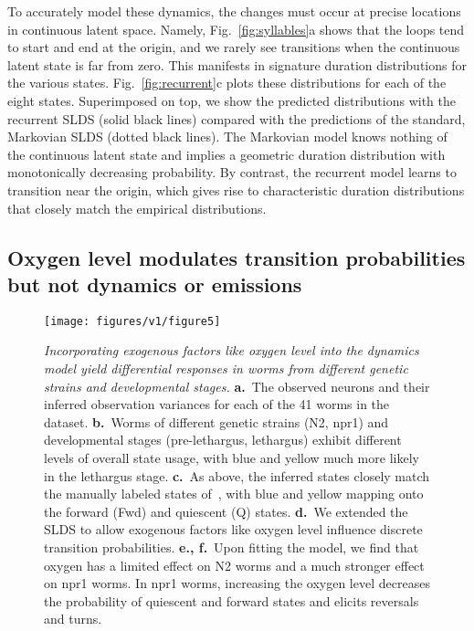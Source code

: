 \documentclass[11pt]{article}
\begin{document}
To accurately model these dynamics, the changes must occur at precise
locations in continuous latent space.  Namely,
Fig.~\ref{fig:syllables}a shows that the loops tend to start and end
at the origin, and we rarely see transitions when the continuous
latent state is far from zero. This manifests in signature duration
distributions for the various states.  Fig.~\ref{fig:recurrent}c plots
these distributions for each of the eight states.  Superimposed on
top, we show the predicted distributions with the recurrent SLDS
(solid black lines) compared with the predictions of the standard,
Markovian SLDS (dotted black lines). The Markovian model knows nothing
of the continuous latent state and implies a geometric duration
distribution with monotonically decreasing probability. By contrast,
the recurrent model learns to transition near the origin, which
gives rise to characteristic duration distributions that closely
match the empirical distributions. 


\subsection*{Oxygen level modulates transition probabilities but not dynamics or emissions}

\begin{figure}[t!]
\centering
\texttt{[image: figures/v1/figure5]} 
\caption{\textit{Incorporating exogenous factors like oxygen level
    into the dynamics model yield differential responses in worms from
    different genetic strains and developmental stages.}
  \textbf{a.}~The observed neurons and their inferred observation variances
  for each of the 41 worms in the~\citet{nichols2017global} dataset.
  \textbf{b.}~Worms of different genetic strains (N2, npr1) and developmental
  stages (pre-lethargus, lethargus) exhibit different levels of overall
  state usage, with blue and yellow much more likely in the lethargus stage.
  \textbf{c.}~As above, the inferred states closely match the manually
  labeled states of~\citet{nichols2017global}, with blue and yellow mapping
  onto the forward (\textsf{Fwd}) and quiescent (\textsf{Q}) states.
  \textbf{d.}~We extended the SLDS to allow exogenous factors like oxygen
  level influence discrete transition probabilities.
  \textbf{e., f.}~Upon fitting the model, we find that oxygen has a limited
  effect on N2 worms and a much stronger effect on npr1 worms. In npr1 worms,
  increasing the oxygen level decreases the probability of quiescent and
  forward states and elicits reversals and turns.
}
\label{fig:o2}
\end{figure}
\end{document}
